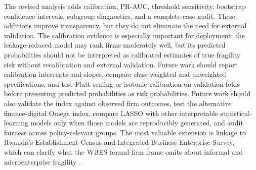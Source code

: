 The revised analysis adds calibration, PR-AUC, threshold sensitivity, bootstrap confidence intervals, subgroup diagnostics, and a complete-case audit. These additions improve transparency, but they do not eliminate the need for external validation. The calibration evidence is especially important for deployment: the leakage-reduced model may rank firms moderately well, but its predicted probabilities should not be interpreted as calibrated estimates of true fragility risk without recalibration and external validation. Future work should report calibration intercepts and slopes, compare class-weighted and unweighted specifications, and test Platt scaling or isotonic calibration on validation folds before presenting predicted probabilities as risk probabilities. Future work should also validate the index against observed firm outcomes, test the alternative finance-digital Omega index, compare LASSO with other interpretable statistical-learning models only when those models are reproducibly generated, and audit fairness across policy-relevant groups. The most valuable extension is linkage to Rwanda's Establishment Census and Integrated Business Enterprise Survey, which can clarify what the WBES formal-firm frame omits about informal and microenterprise fragility \citep{nisr2025ibes, nisr2024establishment}.
